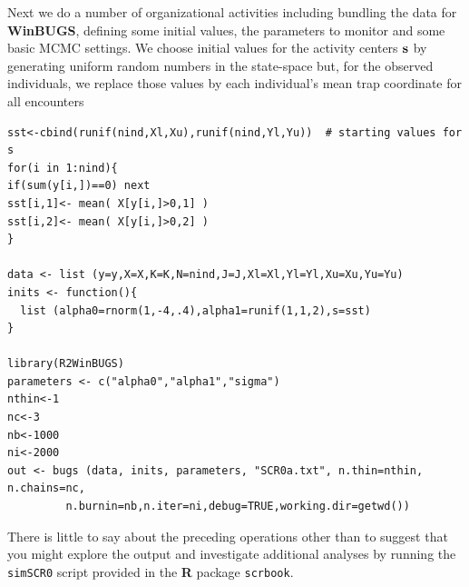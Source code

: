 Next we do a number of organizational activities including bundling
the data for {\bf WinBUGS}, defining some initial values, the parameters to
monitor and some basic MCMC settings.  We choose initial values for
the activity centers ${\bf s}$ by generating uniform random numbers in
the state-space but, for the observed individuals, we replace those
values by each individual's mean trap coordinate for all encounters
{\small
\begin{verbatim}
sst<-cbind(runif(nind,Xl,Xu),runif(nind,Yl,Yu))  # starting values for s
for(i in 1:nind){
if(sum(y[i,])==0) next
sst[i,1]<- mean( X[y[i,]>0,1] )
sst[i,2]<- mean( X[y[i,]>0,2] )
}

data <- list (y=y,X=X,K=K,N=nind,J=J,Xl=Xl,Yl=Yl,Xu=Xu,Yu=Yu)
inits <- function(){
  list (alpha0=rnorm(1,-4,.4),alpha1=runif(1,1,2),s=sst)
}

library(R2WinBUGS)
parameters <- c("alpha0","alpha1","sigma")
nthin<-1
nc<-3
nb<-1000
ni<-2000
out <- bugs (data, inits, parameters, "SCR0a.txt", n.thin=nthin, n.chains=nc,
         n.burnin=nb,n.iter=ni,debug=TRUE,working.dir=getwd())
\end{verbatim}
}
There is little to say about the preceding operations other than to
suggest that you might explore the output and investigate additional
analyses by running the \mbox{\tt simSCR0} script provided in the
{\bf R} package \mbox{\tt scrbook}.

